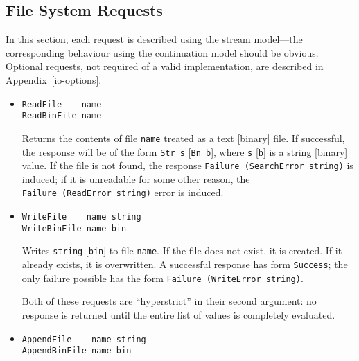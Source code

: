 \subsection{File System Requests}
\label{file-system-requests}

In this section, each request is described using the
stream model---the corresponding behaviour using the
continuation model should be obvious.  Optional requests, not required
of a valid \Haskell{} implementation, are described in
Appendix~\ref{io-options}.

\begin{itemize}
\item
\mbox{\tt ReadFile\ \ \ \ name}\\
\mbox{\tt ReadBinFile\ name}

Returns the contents of file \mbox{\tt name} treated as a text
[binary] file.  If successful, the response will be of the form
\mbox{\tt Str\ s} [\mbox{\tt Bn\ b}], where \mbox{\tt s} [\mbox{\tt b}] is a string [binary] value.  If the
file is not found, the response \mbox{\tt Failure\ (SearchError\ string)} is
induced; if it is unreadable for some other reason, the 
\mbox{\tt Failure\ (ReadError\ string)} error is induced.


\item
\mbox{\tt WriteFile\ \ \ \ name\ string}\\
\mbox{\tt WriteBinFile\ name\ bin}

Writes \mbox{\tt string} [\mbox{\tt bin}] to file \mbox{\tt name}.  If
the file does not exist, it is created.  If it already exists, it is
overwritten.  A successful response has form \mbox{\tt Success}; the only
failure possible has the form \mbox{\tt Failure\ (WriteError\ string)}.

Both of these requests are ``hyperstrict'' in their second argument:
no response is returned until the entire list of values is
completely evaluated.

\item
\mbox{\tt AppendFile\ \ \ \ name\ string}\\
\mbox{\tt AppendBinFile\ name\ bin}


\end{itemize}
